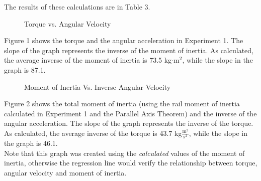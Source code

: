 \documentclass [12pt, letterpaper, twoside] {article}
\begin{document}
\noindent
The results of these calculations are in Table 3. \\

\begin {figure}
  \centering
  \caption {Torque vs. Angular Velocity}
\end {figure}

\noindent
Figure 1 shows the torque and the angular acceleration in Experiment 1. The slope of the graph represents the inverse of the moment of inertia. As calculated, the average inverse of the moment of inertia is 73.5 kg\(\cdot\text{m}^2\), while the slope in the graph is 87.1. \\ %

\begin {figure}[h!]
  \centering
  \caption {Moment of Inertia Vs. Inverse Angular Velocity}
\end {figure}

\noindent
Figure 2 shows the total moment of inertia (using the rail moment of inertia calculated in Experiment 1 and the Parallel Axis Theorem) and the inverse of the angular acceleration. The slope of the graph represents the inverse of the torque. As calculated, the average inverse of the torque is 43.7 kg\(\tfrac{\text{m}^2}{\text{s}^2}\), while the slope in the graph is 46.1. \\ %
Note that this graph was created using the \textit{calculated} values of the moment of inertia, otherwise the regression line would verify the relationship between torque, angular velocity and moment of inertia.
\end{document}
